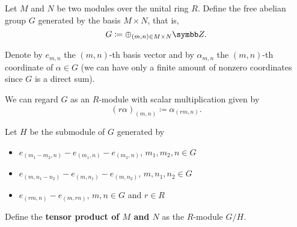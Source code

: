 \begin{definition}\label{def:module_tensor_product}\cite[574]{Knapp2016BAlg}
  Let \( M \) and \( N \) be two modules over the unital ring \( R \). Define the free abelian group \( G \) generated by the basis \( M \times N \), that is,
  \begin{equation*}
    G \coloneqq \oplus_{(m,n) \in M \times N} \BB{Z}.
  \end{equation*}

  Denote by \( e_{m,n} \) the \( (m,n) \)-th basis vector and by \( \alpha_{m,n} \) the \( (m,n) \)-th coordinate of \( \alpha \in G \) (we can have only a finite amount of nonzero coordinates since \( G \) is a direct sum).

  We can regard \( G \) as an \( R \)-module with scalar multiplication given by
  \begin{equation*}
    (r \alpha)_{(m,n)} \coloneqq \alpha_{(rm,n)}.
  \end{equation*}

  Let \( H \) be the submodule of \( G \) generated by
  \begin{itemize}
    \item \( e_{(m_1 - m_2, n)} - e_{(m_1,n)} - e_{(m_2,n)} \), \( m_1, m_2, n \in G \)
    \item \( e_{(m, n_1 - n_2)} - e_{(m,n_1)} - e_{(m,n_2)} \), \( m, n_1, n_2 \in G \)
    \item \( e_{(rm,n)} - e_{(m,rn)} \), \( m, n \in G \) and \( r \in R \)
  \end{itemize}

  Define the \textbf{tensor product of \( M \) and \( N \)} as the \( R \)-module \( G / H \).
\end{definition}

